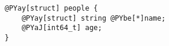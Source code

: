 \begin{Verbatim}[commandchars=@\[\]]
@PYay[struct] people {
    @PYay[struct] string @PYbe[*]name;
    @PYaJ[int64_t] age;
}
\end{Verbatim}
